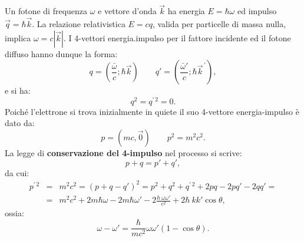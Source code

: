 Un fotone di frequenza $\omega$ e vettore d'onda $\vec{k}$ ha energia $E = \hbar \omega$ ed impulso $\vec{q}= \hbar \vec{k}$. La relazione relativistica $E=cq$, valida per particelle di massa nulla, implica $\omega = c|\vec{k}|$. I 4-vettori energia.impulso per il fattore incidente ed il fotone diffuso hanno dunque la forma:
	\begin{equation}
		q=\left(\frac{\bar \omega}{c}; \hbar \vec{k} \right)\qquad q' = \left(\frac{\bar \omega'}{c}; \hbar {\vec{k}}^{\, \prime}\right),
	\end{equation}
e si ha:
	\begin{equation}
		q^2 = q^{\prime \, 2}=0.
	\end{equation}
Poiché l'elettrone si trova inizialmente in quiete il suo 4-vettore energia-impulso è dato da:
	\begin{equation}
		p=\left(mc, \vec{0} \right)\qquad p^2 =m^2 c^2.
	\end{equation}
La legge di \textbf{conservazione del 4-impulso} nel processo si scrive:
	\begin{equation}
		p+q=p'+q',
	\end{equation}
da cui:
	\begin{eqnarray}
	p^{\prime \, 2} &=& m^2 c^2 = \left( p +q -q'\right)^2= p^2 + q^2 +q^{\prime \, 2}+ 2pq - 2pq' -2 qq'= \nonumber \\
	&=& m^2c^2 + 2m\hbar \omega - 2m \hbar \omega ' - 2 \frac{\hbar \ \omega \omega '}{c^2}+2 \hbar \ k k'  \cos \theta ,
	\end{eqnarray}
ossia:
	\begin{equation}
		\boxed{
			\omega - \omega ' =\frac{\hbar}{m c^2} \omega \omega ' \left( 1-\cos \theta \right).
			}
	\label{eq:cap1_3}
	\end{equation}
